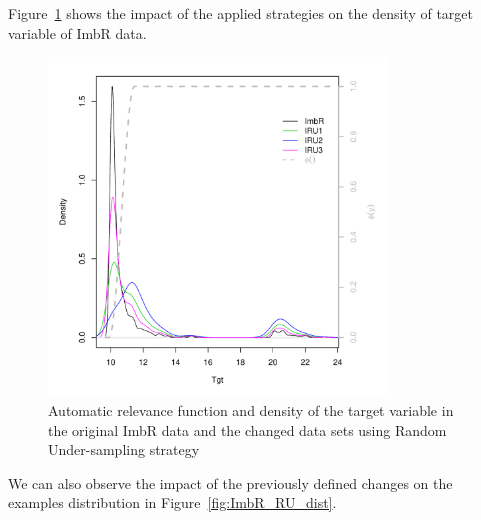\documentclass[10pt,a4paper]{article}\usepackage[]{graphicx}\usepackage[]{color}
\newenvironment{knitrout}{}{} %
\begin{document}
Figure~\ref{fig:ImbR_RU_ex1} shows the impact of the applied strategies on the density of target variable of ImbR data.
\begin{knitrout}\footnotesize
{}\color{fgcolor}\begin{figure}

{\centering \includegraphics[width=0.8\textwidth]{figures/UBL-ImbR_RU_ex1-1} 

}

\caption[Automatic relevance function and density of the target variable in the original ImbR data and the changed data sets using Random Under-sampling strategy]{Automatic relevance function and density of the target variable in the original ImbR data and the changed data sets using Random Under-sampling strategy}\label{fig:ImbR_RU_ex1}
\end{figure}


\end{knitrout}

We can also observe the impact of the previously defined changes on the examples distribution in Figure~\ref{fig:ImbR_RU_dist}.
\end{document}
